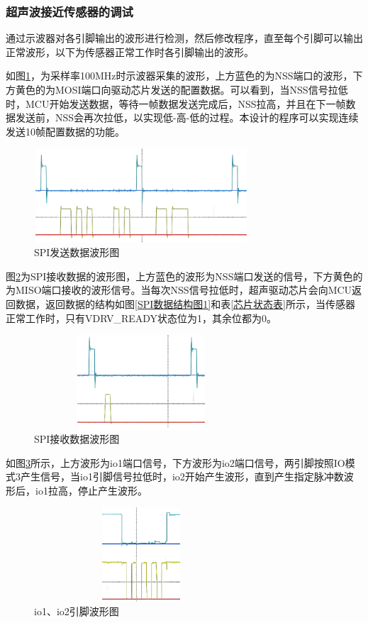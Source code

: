 \subsubsection{超声波接近传感器的调试}
通过示波器对各引脚输出的波形进行检测，然后修改程序，直至每个引脚可以输出正常波形，以下为传感器正常工作时各引脚输出的波形。\par
如图\ref{SPI发送数据波形图}，为采样率100MHz时示波器采集的波形，上方蓝色的为NSS端口的波形，下方黄色的为MOSI端口向驱动芯片发送的配置数据。可以看到，当NSS信号拉低时，MCU开始发送数据，等待一帧数据发送完成后，NSS拉高，并且在下一帧数据发送前，NSS会再次拉低，以实现低-高-低的过程。本设计的程序可以实现连续发送10帧配置数据的功能。
\begin{figure}[!h]
	\centering
	\includegraphics[width=8cm,height=3.5cm]{figure/debug waveform1.png}
	\caption{SPI发送数据波形图}
	\label{SPI发送数据波形图}
\end{figure}\par


图\ref{SPI接收数据波形图}为SPI接收数据的波形图，上方蓝色的波形为NSS端口发送的信号，下方黄色的为MISO端口接收的波形信号。当每次NSS信号拉低时，超声驱动芯片会向MCU返回数据，返回数据的结构如图\ref{SPI数据结构图1}和表\ref{芯片状态表}所示，当传感器正常工作时，只有VDRV\_READY状态位为1，其余位都为0。
\begin{figure}[!h]
	\centering
	\includegraphics[width=8cm,height=3.5cm]{figure/debug waveform2.png}
	\caption{SPI接收数据波形图}
	\label{SPI接收数据波形图}
\end{figure}\par

\newpage
如图\ref{io1、io2引脚波形图}所示，上方波形为io1端口信号，下方波形为io2端口信号，两引脚按照IO模式3产生信号，当io1引脚信号拉低时，io2开始产生波形，直到产生指定脉冲数波形后，io1拉高，停止产生波形。
\begin{figure}[!h]
	\centering
	\includegraphics[width=8cm,height=3.5cm]{figure/debug waveform9.png}
	\caption{io1、io2引脚波形图}
	\label{io1、io2引脚波形图}
\end{figure}\par

